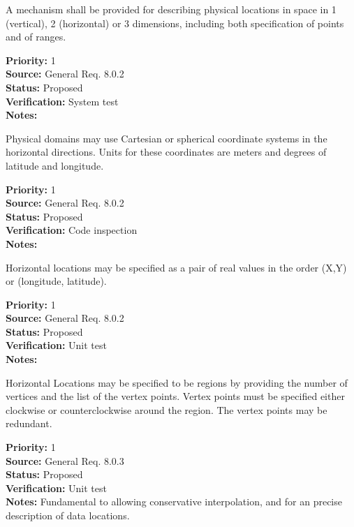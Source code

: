 
A mechanism shall be provided for describing physical locations in space in 1
(vertical), 2 (horizontal) or 3 dimensions, including both specification of
points and of ranges. 
\begin{reqlist}
{\bf Priority:} 1 \\
{\bf Source:} General Req. 8.0.2 \\
{\bf Status:} Proposed \\
{\bf Verification:} System test\\
{\bf Notes:} 
\end{reqlist}



Physical domains may use Cartesian or spherical coordinate systems in the
horizontal directions.  Units for these coordinates are meters and degrees of
latitude and longitude.
\begin{reqlist}
{\bf Priority:} 1 \\
{\bf Source:} General Req. 8.0.2 \\
{\bf Status:} Proposed \\
{\bf Verification:} Code inspection\\
{\bf Notes:}
\end{reqlist}


   Horizontal locations may be specified as a pair of real values in the order
(X,Y) or (longitude, latitude).
\begin{reqlist}
{\bf Priority:} 1 \\
{\bf Source:} General Req. 8.0.2 \\
{\bf Status:} Proposed \\
{\bf Verification:} Unit test\\
{\bf Notes:} 
\end{reqlist}



  Horizontal Locations may be specified to be regions by providing the number
of vertices and the list of the vertex points.  Vertex points must be specified
either clockwise or counterclockwise around the region.  The vertex points
may be redundant.
\begin{reqlist}
{\bf Priority:} 1 \\
{\bf Source:} General Req. 8.0.3 \\
{\bf Status:} Proposed \\
{\bf Verification:} Unit test\\
{\bf Notes:} Fundamental to allowing conservative interpolation, and for an
precise description of data locations.
\end{reqlist}
 
